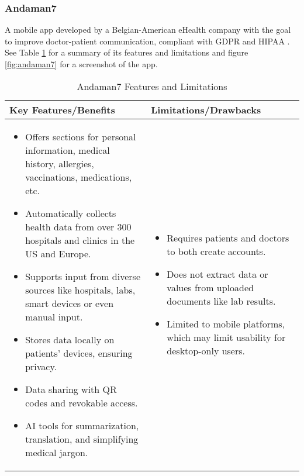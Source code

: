 \FloatBarrier
\clearpage

\subsubsection{Andaman7}

A mobile app developed by a Belgian-American eHealth company with the goal to improve doctor-patient communication, compliant with GDPR and HIPAA \parencite{andaman}. See Table \ref{tab:andaman7} for a summary of its features and limitations and figure \ref{fig:andaman7} for a screenshot of the app.

\begin{table}[htbp]
\centering
    \begin{tabular}{|p{}|p{}|}
    \hline
    \textbf{Key Features/Benefits} & \textbf{Limitations/Drawbacks} \\ \hline
    \begin{itemize}
        \item Offers sections for personal information, medical history, allergies, vaccinations, medications, etc.
        \item Automatically collects health data from over 300 hospitals and clinics in the US and Europe.
        \item Supports input from diverse sources like hospitals, labs, smart devices or even manual input.
        \item Stores data locally on patients’ devices, ensuring privacy.
        \item Data sharing with QR codes and revokable access.
        \item AI tools for summarization, translation, and simplifying medical jargon.
    \end{itemize} &
    \begin{itemize}
        \item Requires patients and doctors to both create accounts.
        \item Does not extract data or values from uploaded documents like lab results.
        \item Limited to mobile platforms, which may limit usability for desktop-only users.
    \end{itemize} \\ \hline
    \end{tabular}
\caption{Andaman7 Features and Limitations}
\label{tab:andaman7}
\end{table}

